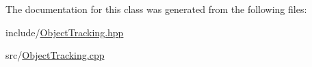 \-The documentation for this class was generated from the following files\-:\begin{DoxyCompactItemize}
\item 
include/\hyperlink{ObjectTracking_8hpp}{\-Object\-Tracking.\-hpp}\item 
src/\hyperlink{ObjectTracking_8cpp}{\-Object\-Tracking.\-cpp}\end{DoxyCompactItemize}
